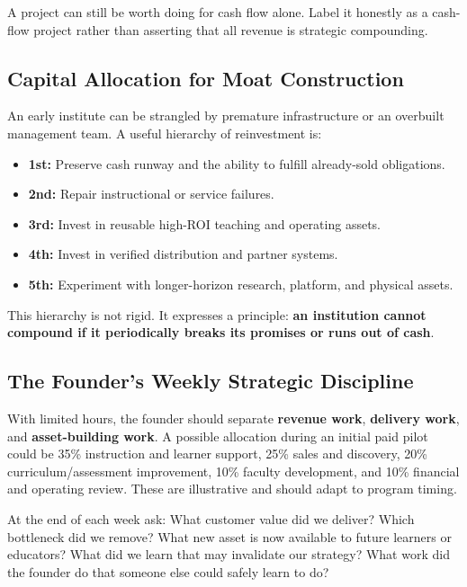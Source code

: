 A project can still be worth doing for cash flow alone. Label it honestly as a cash-flow project rather than asserting that all revenue is strategic compounding.

\subsection{Capital Allocation for Moat Construction}
\label{sec:capital_allocation_moat_construction}

An early institute can be strangled by premature infrastructure or an overbuilt management team. A useful hierarchy of reinvestment is:
\begin{itemize}
    \item \textbf{1st:} Preserve cash runway and the ability to fulfill already-sold obligations.
    \item \textbf{2nd:} Repair instructional or service failures.
    \item \textbf{3rd:} Invest in reusable high-ROI teaching and operating assets.
    \item \textbf{4th:} Invest in verified distribution and partner systems.
    \item \textbf{5th:} Experiment with longer-horizon research, platform, and physical assets.
\end{itemize}

This hierarchy is not rigid. It expresses a principle: \textbf{an institution cannot compound if it periodically breaks its promises or runs out of cash}.

\subsection{The Founder's Weekly Strategic Discipline}
\label{sec:founders_weekly_strategic_discipline}

With limited hours, the founder should separate \textbf{revenue work}, \textbf{delivery work}, and \textbf{asset-building work}. A possible allocation during an initial paid pilot could be 35\% instruction and learner support, 25\% sales and discovery, 20\% curriculum/assessment improvement, 10\% faculty development, and 10\% financial and operating review. These are illustrative and should adapt to program timing.

At the end of each week ask: What customer value did we deliver? Which bottleneck did we remove? What new asset is now available to future learners or educators? What did we learn that may invalidate our strategy? What work did the founder do that someone else could safely learn to do?

